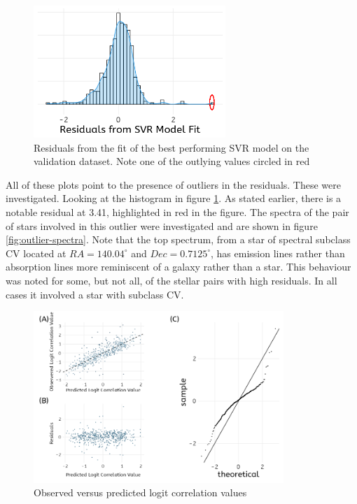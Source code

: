 \documentclass[preprint, 3p,
authoryear]{elsarticle} %
\begin{document}
\begin{figure}
  \centering
  \includegraphics[width=\columnwidth, height = 5cm, width = 10cm]{figures/histogram}
    \caption{Residuals from the fit of the best performing SVR model on the validation dataset. Note one of the outlying values circled in red}
    \label{fig:histogram-residuals}
\end{figure}

All of these plots point to the presence of outliers in the residuals.
These were investigated. Looking at the histogram in figure
\ref{fig:histogram-residuals}. As stated earlier, there is a notable
residual at 3.41, highlighted in red in the figure. The spectra of the
pair of stars involved in this outlier were investigated and are shown
in figure \ref{fig:outlier-spectra}. Note that the top spectrum, from a
star of spectral subclass CV located at \(RA = 140.04^{\circ}\) and
\(Dec = 0.7125^{\circ}\), has emission lines rather than absorption
lines more reminiscent of a galaxy rather than a star. This behaviour
was noted for some, but not all, of the stellar pairs with high
residuals. In all cases it involved a star with subclass CV.

\begin{figure}
\centering
  \includegraphics[width=\columnwidth, height = 6.5cm, width = 10cm]{figures/residuals}
    \caption{Observed versus predicted logit correlation values}
    \label{fig:obs-pred}
\end{figure}
\end{document}
